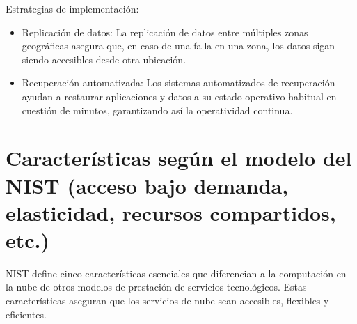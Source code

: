 {            Estrategias de implementaci{\'o}n:

            \begin{itemize}
                \item Replicaci{\'o}n de datos: La replicaci{\'o}n de datos entre m{\'u}ltiples zonas geogr{\'a}ficas asegura que, en caso de una falla en una zona, los datos sigan siendo accesibles desde otra ubicaci{\'o}n.
                \item Recuperaci{\'o}n automatizada: Los sistemas automatizados de recuperaci{\'o}n ayudan a restaurar aplicaciones y datos a su estado operativo habitual en cuesti{\'o}n de minutos, garantizando as{\'i} la operatividad continua.
            \end{itemize}
    \section[Cloud Computing seg{\'u}n NIST]{Caracter{\'i}sticas seg{\'u}n el modelo del NIST (acceso bajo demanda, elasticidad, recursos compartidos, etc.)}
        NIST define cinco caracter{\'i}sticas esenciales que diferencian a la computaci{\'o}n en la nube de otros modelos de prestaci{\'o}n de servicios tecnol{\'o}gicos. Estas caracter{\'i}sticas aseguran que los servicios de nube sean accesibles, flexibles y eficientes.
        
}

